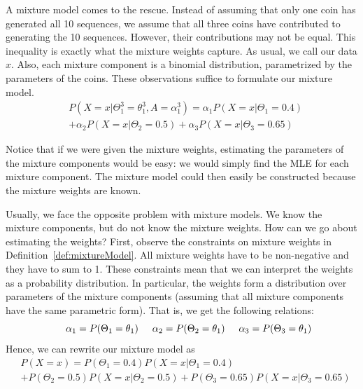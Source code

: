 A mixture model comes to the rescue. Instead of assuming that only one coin has generated all 10 sequences,
we assume that all three coins have contributed to generating the 10 sequences. However, their contributions
may not be equal. This inequality is exactly what the mixture weights capture. As usual, we call our data $ x $. Also, each mixture component is a binomial distribution, parametrized by the parameters of
the coins. These observations suffice to formulate our mixture model.
\begin{align}\label{eq:mixtureExample}
&P(X=x|\Theta_{1}^{3}=\theta_{1}^{3}, A = \alpha_{1}^{3}) 
= \alpha_{1}P(X=x|\Theta_{1}=0.4) \\
&+ \alpha_{2}P(X=x|\Theta_{2}=0.5) + \alpha_{3}P(X=x|\Theta_{3}=0.65) \nonumber
\end{align}

Notice that if we were given the mixture weights, estimating
the parameters of the mixture components would be easy: we would simply find the MLE for each mixture component. The mixture
model could then easily be constructed because the mixture weights are known. 

Usually, we face the opposite problem with mixture models. We know the mixture components, but do not know the mixture weights.
How can we go about estimating the weights? First, observe the constraints
on mixture weights in Definition~\ref{def:mixtureModel}. All mixture weights have to be non-negative and they have to sum to 1.
These constraints mean that we can interpret the weights as a probability distribution. In particular, the weights form a distribution over parameters
of the mixture components (assuming that all mixture components have the same parametric form). That is, we get the following
relations:
\begin{equation}
\hskip 0.5cm \alpha_{1} = P(\Theta_{1} = \theta_{1}) \hskip 0.5cm \alpha_{2} = P(\Theta_{2} = \theta_{1}) \hskip 0.5cm \alpha_{3} = P(\Theta_{3} = \theta_{1})
\end{equation}
Hence, we can rewrite our mixture model as
\begin{align} \label{eq:probabilisticMixtureModel}
&P(X=x) 
= P(\Theta_{1} = 0.4)P(X=x|\Theta_{1}=0.4) \\
&+ P(\Theta_{2} = 0.5)P(X=x|\Theta_{2}=0.5) + P(\Theta_{3} = 0.65)P(X=x|\Theta_{3}=0.65) \nonumber
\end{align}

